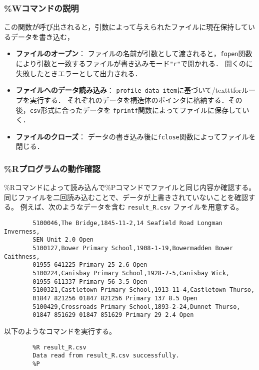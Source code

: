     \subsubsection{\%Wコマンドの説明}
    この関数が呼び出されると，引数によって与えられたファイルに現在保持しているデータを書き込む，
    
    \begin{itemize}
      \item\textbf{ファイルのオープン}：
      ファイルの名前が引数として渡されると，\texttt{fopen}関数により引数と一致するファイルが書き込みモード\texttt{"r"}で開かれる．
      開くのに失敗したときエラーとして出力される．
      \item\textbf{ファイルへのデータ読み込み}：
      \texttt{profile\_data\_item}に基づいて/texttt{for}ループを実行する．
      それぞれのデータを構造体のポインタに格納する．その後，\texttt{csv}形式に合ったデータを
      \texttt{fprintf}関数によってファイルに保存していく．
      \item \textbf{ファイルのクローズ}：
      データの書き込み後に\texttt{fclose}関数によってファイルを閉じる．


    \end{itemize}
    \subsubsection{\%Rプログラムの動作確認}
        \%Rコマンドによって読み込んで\%Pコマンドでファイルと同じ内容か確認する。同じファイルを二回読み込むことで、データが上書きされていないことを確認する。
        例えば、次のようなデータを含む \texttt{result\_R.csv} ファイルを用意する。
        \begin{verbatim}
        5100046,The Bridge,1845-11-2,14 Seafield Road Longman Inverness,
        SEN Unit 2.0 Open
        5100127,Bower Primary School,1908-1-19,Bowermadden Bower Caithness,
        01955 641225 Primary 25 2.6 Open
        5100224,Canisbay Primary School,1928-7-5,Canisbay Wick,
        01955 611337 Primary 56 3.5 Open
        5100321,Castletown Primary School,1913-11-4,Castletown Thurso,
        01847 821256 01847 821256 Primary 137 8.5 Open
        5100429,Crossroads Primary School,1893-2-24,Dunnet Thurso,
        01847 851629 01847 851629 Primary 29 2.4 Open
        \end{verbatim}

        以下のようなコマンドを実行する。
        \begin{verbatim}
        %R result_R.csv
        Data read from result_R.csv successfully.
        %P
        \end{verbatim}

